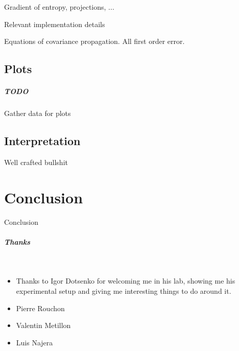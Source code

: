 \documentclass[10pt]{report}
\theoremstyle{plain}
\theoremstyle{definition}
\theoremstyle{remark}
\begin{document}
Gradient of entropy, projections, ...

Relevant implementation details

Equations of covariance propagation. All first order error.

\section{Plots}

\paragraph{TODO} Gather data for plots

\section{Interpretation}

Well crafted bullshit

\chapter*{Conclusion} %

Conclusion



\vfill

\paragraph{\Huge Thanks}

\

\vspace{3mm}

\begin{itemize}

\item Thanks to Igor Dotsenko for welcoming me in his lab, showing me his
  experimental setup and giving me interesting things to do around it.
\item Pierre Rouchon
\item Valentin Metillon
\item Luis Najera

\end{itemize}

\vfill



\end{document}
